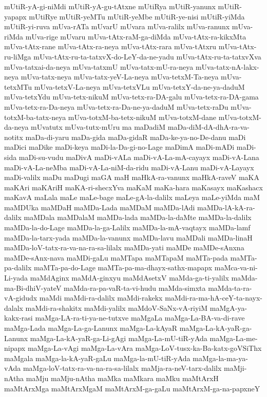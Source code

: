 {mUtiR-yA-gi-niMdi
mUtiR-yA-gu-tAtxne
mUtiRya
mUtiR-yanunx
mUtiR-yapapx
mUtiRye
mUtiR-yeMTu
mUtiR-yeMbe
mUtiR-ye-nisi
mUtiR-yiMda
mUtiR-yi-ruva
mUva-rATa
mUvarU
mUvara
mUva-ralilx
mUva-ranunx
mUva-riMda
mUva-rige
mUvaru
mUva-tAtx-raM-ga-diMda
mUva-tAtx-ra-kikxMta
mUva-tAtx-rane
mUva-tAtx-ra-neya
mUva-tAtx-rara
mUva-tAtxru
mUva-tAtx-ru-liMga
mUva-tAtx-ru-ta-tatxvX-do-LeY-da-ne-yadu
mUva-tAtx-ru-ta-tatxvXva
mUva-tatxai-da-neya
mUva-tatxmU
mUva-tatx-mU-ra-neya
mUva-tatx-nA-lakx-neya
mUva-tatx-neya
mUva-tatx-yeV-La-neya
mUva-tetxM-Ta-neya
mUva-tetxMTu
mUva-tetxV-La-neya
mUva-tetxVLu
mUva-tetxY-da-ne-ya-daduM
mUva-tetxYdu
mUva-tetx-nikuM
mUva-tetx-ra-DA-galu
mUva-tetx-ra-DA-gama
mUva-tetx-ra-Da-neya
mUva-tetx-ra-Da-ne-ya-daduM
mUva-tetx-raDu
mUva-totxM-ba-tatx-neya
mUva-totxM-ba-tetx-nikuM
mUva-totxM-dane
mUva-totxM-da-neya
mUvatutx
mUva-tutx-mUru
ma
maDadiM
maDa-diM-dA-dhA-ra-va-notitx
maDa-di-yaru
maDa-gida
maDa-gidaR
maDa-ke-ya-no-De-danu
maDi
maDici
maDike
maDi-keya
maDi-la-Da-gi-no-Lage
maDimA
maDi-mADi
maDi-sida
maDi-su-vudu
maDivA
maDi-vALa
maDi-vA-La-mA-cayayx
maDi-vA-Lana
maDi-vA-La-neMba
maDi-vA-La-niM-da-ridu
maDi-vA-Lanu
maDi-vA-Layayx
maDi-valilx
maDu
maDugi
maGA
maH
maHkA-ra-vanunx
maHkA-raveV
maKA
maKAri
maKAriH
maKA-ri-shecxYva
maKaM
maKa-hara
maKasayx
maKashacx
maKavA
maLala
maLe
maLe-bage
maLe-gA-la-dalilx
maLeya
maLe-yiMda
maM
maMDUka
maMDaH
maMDa-Lada
maMDaM
maMDa-lAdi
maMDa-lA-kA-ra-dalilx
maMDala
maMDalaM
maMDa-lada
maMDa-la-daMte
maMDa-la-dalilx
maMDa-la-do-Lage
maMDa-la-ga-Lalilx
maMDa-la-mA-vaqtayx
maMDa-lamf
maMDa-la-tarx-yada
maMDa-la-vanunx
maMDa-lavu
maMDali
maMDa-linaH
maMDa-loV-tatx-ra-va-na-ra-sa-lilalx
maMDa-yati
maMDe
maMDe-sAnxna
maMDe-sAnx-nava
maMDi-gaLu
maMTapa
maMTapaM
maMTa-pada
maMTa-pa-dalilx
maMTa-pa-do-Lage
maMTa-pa-ma-dhayx-sathx-mapapx
maMca-va-ni-Li-yada
maMdAginx
maMdA-ginxyu
maMdAsetxV
maMda-ga-ti-yalilx
maMda-ma-Bi-dhiV-yateV
maMda-ra-pa-vaR-ta-vi-hudu
maMda-simxta
maMda-ta-ra-vA-gidudx
maMdi
maMdi-ra-dalilx
maMdi-rakekx
maMdi-ra-ma-hA-ceY-ta-nayx-dalalx
maMdi-ra-shakitx
maMdi-yalilx
maMdoV-SaNx-vA-riyiM
maMgA-ya-kakx-rasi
maMga-LA-ra-ti-ya-ne-tutxve
maMgaLa
maMga-La-BA-va-di-rave
maMga-Lada
maMga-La-ga-Lanunx
maMga-La-kAyaR
maMga-La-kA-yaR-ga-Lanunx
maMga-La-kA-yaR-ga-Li-gAgi
maMga-La-mU-tiR-yAda
maMga-La-me-nipapx
maMga-La-vAgi
maMga-La-vAra
maMga-LoV-tusx-ka-Ba-katx-goVSiThx
maMgala
maMga-la-kA-yaR-gaLu
maMga-la-mU-tiR-yAda
maMga-la-ma-ya-vAda
maMga-loV-tatx-ra-va-na-ra-sa-lilalx
maMja-ra-neV-tarx-dalilx
maMji-nAtha
maMju
maMju-nAtha
maMka
maMkara
maMku
maMtArxH
maMtArxMga
maMtArxMgaM
maMtArxM-ga-gaLu
maMtArxM-ga-na-papxneY
}
